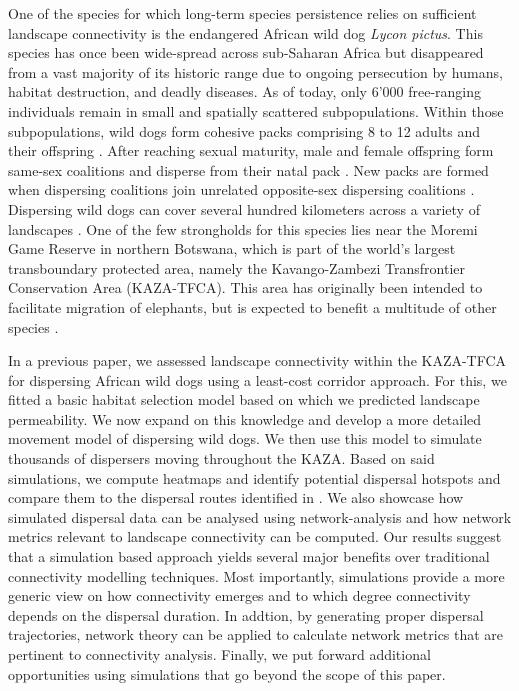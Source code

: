 \documentclass[abstract=on,10pt,a4paper,bibliography=totocnumbered]{article}
\begin{document}
One of the species for which long-term species persistence relies on sufficient
landscape connectivity is the endangered African wild dog \textit{Lycon pictus}.
This species has once been wide-spread across sub-Saharan Africa but disappeared
from a vast majority of its historic range due to ongoing persecution by humans,
habitat destruction, and deadly diseases. As of today, only 6'000 free-ranging
individuals remain in small and spatially scattered subpopulations. Within those
subpopulations, wild dogs form cohesive packs comprising 8 to 12 adults and
their offspring \cite{McNutt.1995}. After reaching sexual maturity, male and
female offspring form same-sex coalitions and disperse from their natal pack
\citep{McNutt.1996, Behr.2020}. New packs are formed when dispersing coalitions
join unrelated opposite-sex dispersing coalitions \citep{McNutt.1996}.
Dispersing wild dogs can cover several hundred kilometers across a variety of
landscapes \citep{DaviesMostert.2012, Masenga.2016, Cozzi.2020, Hofmann.2021}.
One of the few strongholds for this species lies near the Moremi Game Reserve in
northern Botswana, which is part of the world's largest transboundary protected
area, namely the Kavango-Zambezi Transfrontier Conservation Area (KAZA-TFCA).
This area has originally been intended to facilitate migration of elephants, but
is expected to benefit a multitude of other species \citep{Elliot.2014,
Brennan.2020, Hofmann.2021}.

In a previous paper, we assessed landscape connectivity within the KAZA-TFCA for
dispersing African wild dogs using a least-cost corridor approach. For this, we
fitted a basic habitat selection model based on which we predicted landscape
permeability. We now expand on this knowledge and develop a more detailed
movement model of dispersing wild dogs. We then use this model to simulate
thousands of dispersers moving throughout the KAZA. Based on said simulations,
we compute heatmaps and identify potential dispersal hotspots and compare them
to the dispersal routes identified in \citep{Hofmann.2021}. We also showcase how
simulated dispersal data can be analysed using network-analysis and how network
metrics relevant to landscape connectivity can be computed. Our results suggest
that a simulation based approach yields several major benefits over traditional
connectivity modelling techniques. Most importantly, simulations provide a more
generic view on how connectivity emerges and to which degree connectivity
depends on the dispersal duration. In addtion, by generating proper dispersal
trajectories, network theory can be applied to calculate network metrics that
are pertinent to connectivity analysis. Finally, we put forward additional
opportunities using simulations that go beyond the scope of this paper.
\end{document}
